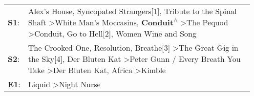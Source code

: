 \begin{supertabular}{p{0.03\textwidth}p{0.92\textwidth}}
 \textbf{S1}:  &  Alex's House\textsuperscript{}, \enspace Syncopated Strangers[1]\textsuperscript{}, \enspace Tribute to the Spinal Shaft\textsuperscript{} \textgreater \enspace White Man's Moccasins\textsuperscript{}, \enspace \textbf{Conduit\textsuperscript{$\wedge$}} \textgreater \enspace The Pequod\textsuperscript{} \textgreater \enspace Conduit\textsuperscript{}, \enspace Go to Hell[2]\textsuperscript{}, \enspace Women Wine and Song\textsuperscript{}  \enspace  \\
 \textbf{S2}:  &          The Crooked One\textsuperscript{}, \enspace Resolution\textsuperscript{}, \enspace Breathe[3]\textsuperscript{} \textgreater \enspace The Great Gig in the Sky[4]\textsuperscript{}, \enspace Der Bluten Kat\textsuperscript{} \textgreater \enspace Peter Gunn / Every Breath You Take\textsuperscript{} \textgreater \enspace Der Bluten Kat\textsuperscript{}, \enspace Africa\textsuperscript{} \textgreater \enspace Kimble\textsuperscript{}  \enspace  \\
 \textbf{E1}:  &                                                                                                                                                                                                                                                                                                                                                                                Liquid\textsuperscript{} \textgreater \enspace Night Nurse\textsuperscript{}  \enspace  \\
\end{supertabular}
